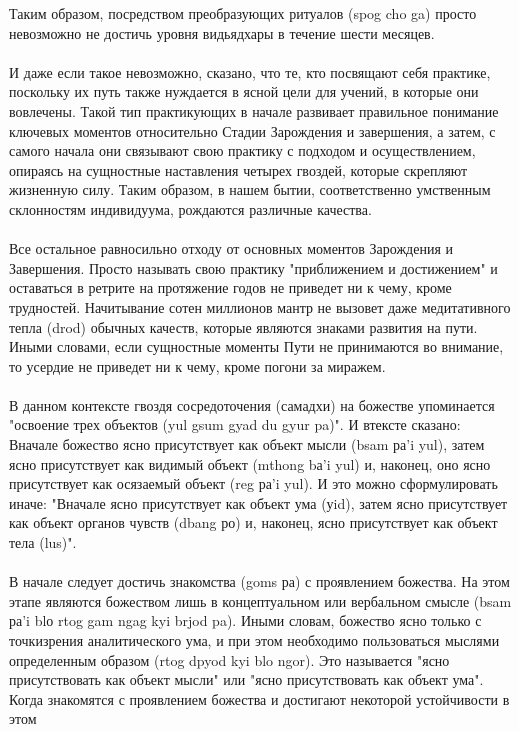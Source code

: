 \begin{siderules}
Таким образом, посредством преобразующих ритуалов (spog cho ga) просто невозможно не
достичь уровня видьядхары в течение шести месяцев.\\
\\
И даже если такое невозможно, сказано, что те, кто посвящают себя практике, поскольку их
путь также нуждается в ясной цели для учений, в которые они вовлечены. Такой тип
практикующих в начале развивает правильное понимание ключевых моментов относительно
Стадии Зарождения и завершения, а затем, с самого начала они связывают свою практику с
подходом и осуществлением, опираясь на сущностные наставления четырех гвоздей,
которые скрепляют жизненную силу. Таким образом, в нашем бытии, соответственно
умственным склонностям индивидуума, рождаются различные качества.\\
\\
Все остальное равносильно отходу от основных моментов Зарождения и Завершения. Просто
называть свою практику "приближением и достижением" и оставаться в ретрите на
протяжение годов не приведет ни к чему, кроме трудностей. Начитывание сотен миллионов
мантр не вызовет даже медитативного тепла (drod) обычных качеств, которые являются
знаками развития на пути. Иными словами, если сущностные моменты Пути не
принимаются во внимание, то усердие не приведет ни к чему, кроме погони за миражем.\\
\\
В данном контексте гвоздя сосредоточения (самадхи) на божестве упоминается "освоение
трех объектов (yul gsum gyad du gyur pa)". И втексте сказано: Вначале божество ясно
присутствует как объект мысли (bsam ра'i yul), затем ясно присутствует как видимый
объект (mthong bа'i yul) и, наконец, оно ясно присутствует как осязаемый
объект (reg ра'i yul). И это можно сформулировать иначе: "Вначале ясно присутствует
как объект ума (уid), затем ясно присутствует как объект органов чувств (dbang ро) и,
наконец, ясно присутствует как объект тела (lus)".\\
\\
В начале следует достичь знакомства (goms ра) с проявлением божества. На этом этапе
являются божеством лишь в концептуальном или вербальном смысле (bsam ра'i blо rtog gam ngag kyi brjod pa).
Иными словам, божество ясно только с точкизрения аналитического ума,
и при этом необходимо пользоваться мыслями определенным образом (rtog dpyod kyi blo ngor).
Это называется "ясно присутствовать как объект мысли" или "ясно присутствовать как объект ума".
Когда знакомятся с проявлением божества и достигают некоторой устойчивости в этом

\end{siderules}
